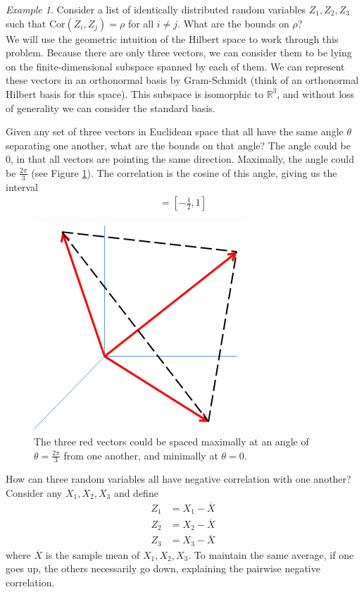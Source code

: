 \documentclass[11pt]{article}
\newcommand{\R}{\ensuremath{\mathbb R}}
\theoremstyle{plain}
\theoremstyle{definition}
\theoremstyle{remark}
\newtheorem{exm}{Example}[section]
\begin{document}
\begin{exm}
    Consider a list of identically distributed random variables $Z_1, Z_2, Z_3$ such that $\text{Cor}(Z_i, Z_j) = \rho$ for all $i \neq j$. What are the bounds on $\rho$?\\
    
    We will use the geometric intuition of the Hilbert space to work through this problem. Because there are only three vectors, we can consider them to be lying on the finite-dimensional subspace spanned by each of them. We can represent these vectors in an orthonormal basis by Gram-Schmidt (think of an orthonormal Hilbert basis for this space). This subspace is isomorphic to $\R^3$, and without loss of generality we can consider the standard basis.
    
    Given any set of three vectors in Euclidean space that all have the same angle $\theta$ separating one another, what are the bounds on that angle? The angle could be 0, in that all vectors are pointing the same direction. Maximally, the angle could be $\frac{2\pi}{3}$ (see Figure \ref{fig:three_vecs}). The correlation is the cosine of this angle, giving us the interval
    \begin{align*}
        [\cos(\tfrac{2\pi}{3}), \cos(0)] = [-\tfrac{1}{2}, 1]
    \end{align*}
    \begin{figure}
        \centering
        \includegraphics[width=0.5\linewidth]{figures/three_vecs.png}
        \caption{The three red vectors could be spaced maximally at an angle of $\theta = \frac{2\pi}{3}$ from one another, and minimally at $\theta = 0$.}
        \label{fig:three_vecs}
    \end{figure}
    How can three random variables all have negative correlation with one another? Consider any $X_1, X_2, X_3$ and define
    \begin{align*}
        Z_1 &= X_1 - \overline{X}\\
        Z_2 &= X_2 - \overline{X}\\
        Z_3 &= X_3 - \overline{X}
    \end{align*}
    where $\overline{X}$ is the sample mean of $X_1, X_2, X_3$. To maintain the same average, if one goes up, the others necessarily go down, explaining the pairwise negative correlation.
\end{exm}
\end{document}
